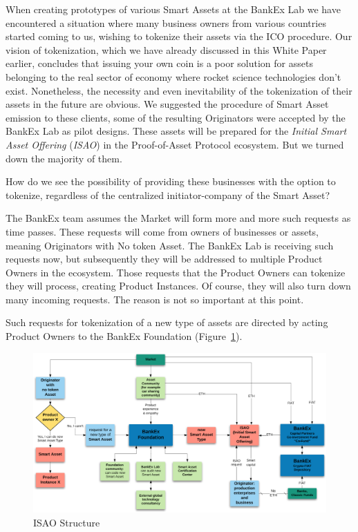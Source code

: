 \documentclass{article}
\begin{document}
\begin{multicols}{2}
When creating prototypes of various Smart Assets at the BankEx Lab we have encountered a situation where many business owners from various countries started coming to us, wishing to tokenize their assets via the ICO procedure. Our vision of tokenization, which we have already discussed in this White Paper earlier, concludes that issuing your own coin is a poor solution for assets belonging to the real sector of economy where rocket science technologies don’t exist. Nonetheless, the necessity and even inevitability of the tokenization of their assets in the future are obvious. We suggested the procedure of Smart Asset emission to these clients, some of the resulting Originators were accepted by the BankEx Lab as pilot designs. These assets will be prepared for the \textit{Initial Smart Asset Offering} (\textit{ISAO}) in the Proof-of-Asset Protocol ecosystem. But we turned down the majority of them.

How do we see the possibility of providing these businesses with the option to tokenize, regardless of the centralized initiator-company of the Smart Asset?

The BankEx team assumes the Market will form more and more such requests as time passes. These requests will come from owners of businesses or assets, meaning Originators with No token Asset. The BankEx Lab is receiving such requests now, but subsequently they will be addressed to multiple Product Owners in the ecosystem. Those requests that the Product Owners can tokenize they will process, creating Product Instances. Of course, they will also turn down many incoming requests. The reason is not so important at this point.

Such requests for tokenization of a new type of assets are directed by acting Product Owners to the BankEx Foundation (Figure~\ref{fig:isao}). 

\begin{figure}
  \centering
  \includegraphics[width=\textwidth]{isao}
  \caption{ISAO Structure}
  \label{fig:isao}
\end{figure}


\end{multicols}
\end{document}
